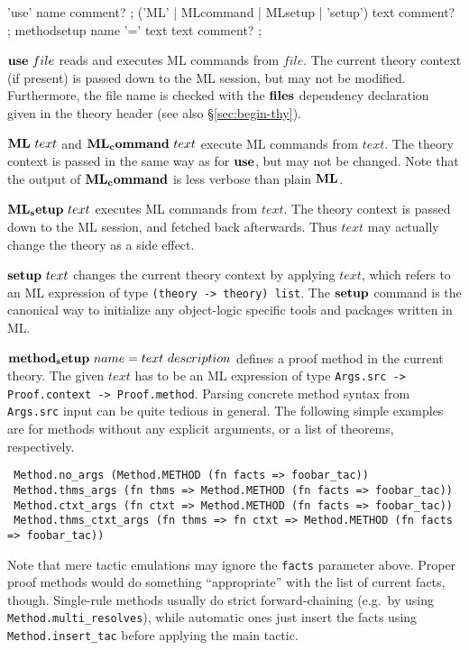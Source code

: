 \begin{rail}
  'use' name comment?
  ;
  ('ML' | MLcommand | MLsetup | 'setup') text comment?
  ;
  methodsetup name '=' text text comment?
  ;
\end{rail}

\begin{descr}
\item [${\mathord{\mathbf{use}}}~file$] reads and executes ML commands from $file$.
  The current theory context (if present) is passed down to the ML session,
  but may not be modified.  Furthermore, the file name is checked with the
  ${\mathord{\mathbf{files}}}$ dependency declaration given in the theory header (see
  also \S\ref{sec:begin-thy}).
  
\item [${\mathord{\mathbf{ML}}}~text$ and ${\mathord{\mathbf{ML_command}}}~text$] execute ML
  commands from $text$.  The theory context is passed in the same way as for
  ${\mathord{\mathbf{use}}}$, but may not be changed.  Note that the output of
  ${\mathord{\mathbf{ML_command}}}$ is less verbose than plain ${\mathord{\mathbf{ML}}}$.
  
\item [${\mathord{\mathbf{ML_setup}}}~text$] executes ML commands from $text$.  The
  theory context is passed down to the ML session, and fetched back
  afterwards.  Thus $text$ may actually change the theory as a side effect.
  
\item [${\mathord{\mathbf{setup}}}~text$] changes the current theory context by
  applying $text$, which refers to an ML expression of type
  \texttt{(theory~->~theory)~list}.  The ${\mathord{\mathbf{setup}}}$ command is the
  canonical way to initialize any object-logic specific tools and packages
  written in ML.
  
\item [${\mathord{\mathbf{method_setup}}}~name = text~description$] defines a proof
  method in the current theory.  The given $text$ has to be an ML expression
  of type \texttt{Args.src -> Proof.context -> Proof.method}.  Parsing
  concrete method syntax from \texttt{Args.src} input can be quite tedious in
  general.  The following simple examples are for methods without any explicit
  arguments, or a list of theorems, respectively.

{\footnotesize
\begin{verbatim}
 Method.no_args (Method.METHOD (fn facts => foobar_tac))
 Method.thms_args (fn thms => Method.METHOD (fn facts => foobar_tac))
 Method.ctxt_args (fn ctxt => Method.METHOD (fn facts => foobar_tac))
 Method.thms_ctxt_args (fn thms => fn ctxt => Method.METHOD (fn facts => foobar_tac))
\end{verbatim}
}

Note that mere tactic emulations may ignore the \texttt{facts} parameter
above.  Proper proof methods would do something ``appropriate'' with the list
of current facts, though.  Single-rule methods usually do strict
forward-chaining (e.g.\ by using \texttt{Method.multi_resolves}), while
automatic ones just insert the facts using \texttt{Method.insert_tac} before
applying the main tactic.
\end{descr}


